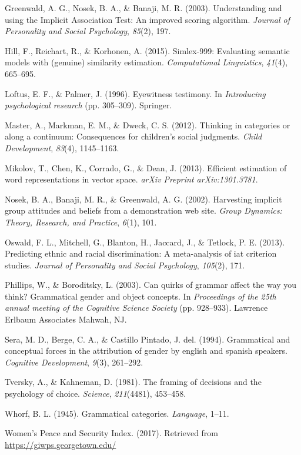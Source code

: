 \documentclass[10pt, letterpaper]{article}
\begin{document}
\hypertarget{ref-greenwald2003understanding}{}
Greenwald, A. G., Nosek, B. A., \& Banaji, M. R. (2003). Understanding
and using the Implicit Association Test: An improved scoring algorithm.
\emph{Journal of Personality and Social Psychology}, \emph{85}(2), 197.

\hypertarget{ref-hill2015simlex}{}
Hill, F., Reichart, R., \& Korhonen, A. (2015). Simlex-999: Evaluating
semantic models with (genuine) similarity estimation.
\emph{Computational Linguistics}, \emph{41}(4), 665--695.

\hypertarget{ref-loftus1996eyewitness}{}
Loftus, E. F., \& Palmer, J. (1996). Eyewitness testimony. In
\emph{Introducing psychological research} (pp. 305--309). Springer.

\hypertarget{ref-master2012thinking}{}
Master, A., Markman, E. M., \& Dweck, C. S. (2012). Thinking in
categories or along a continuum: Consequences for children's social
judgments. \emph{Child Development}, \emph{83}(4), 1145--1163.

\hypertarget{ref-mikolov2013efficient}{}
Mikolov, T., Chen, K., Corrado, G., \& Dean, J. (2013). Efficient
estimation of word representations in vector space. \emph{arXiv Preprint
arXiv:1301.3781}.

\hypertarget{ref-nosek2002harvesting}{}
Nosek, B. A., Banaji, M. R., \& Greenwald, A. G. (2002). Harvesting
implicit group attitudes and beliefs from a demonstration web site.
\emph{Group Dynamics: Theory, Research, and Practice}, \emph{6}(1), 101.

\hypertarget{ref-oswald2013predicting}{}
Oswald, F. L., Mitchell, G., Blanton, H., Jaccard, J., \& Tetlock, P. E.
(2013). Predicting ethnic and racial discrimination: A meta-analysis of
iat criterion studies. \emph{Journal of Personality and Social
Psychology}, \emph{105}(2), 171.

\hypertarget{ref-phillips2003can}{}
Phillips, W., \& Boroditsky, L. (2003). Can quirks of grammar affect the
way you think? Grammatical gender and object concepts. In
\emph{Proceedings of the 25th annual meeting of the Cognitive Science
Society} (pp. 928--933). Lawrence Erlbaum Associates Mahwah, NJ.

\hypertarget{ref-sera1994grammatical}{}
Sera, M. D., Berge, C. A., \& Castillo Pintado, J. del. (1994).
Grammatical and conceptual forces in the attribution of gender by
english and spanish speakers. \emph{Cognitive Development}, \emph{9}(3),
261--292.

\hypertarget{ref-tversky1981framing}{}
Tversky, A., \& Kahneman, D. (1981). The framing of decisions and the
psychology of choice. \emph{Science}, \emph{211}(4481), 453--458.

\hypertarget{ref-whorf1945grammatical}{}
Whorf, B. L. (1945). Grammatical categories. \emph{Language}, 1--11.

\hypertarget{ref-wps}{}
Women's Peace and Security Index. (2017). Retrieved from
\url{https://giwps.georgetown.edu/}
\end{document}
